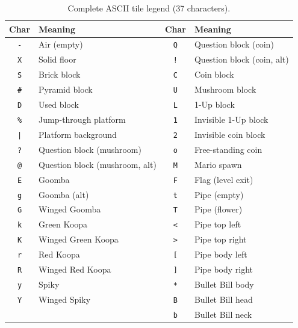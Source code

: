 \documentclass[shortabstract, mgr, english]{iithesis}
\begin{document}
\begin{table}[H]
\centering
\small
\begin{tabular}{cl|cl}
\toprule
\textbf{Char} & \textbf{Meaning} & \textbf{Char} & \textbf{Meaning} \\
\midrule
\texttt{-} & Air (empty)           & \texttt{Q} & Question block (coin) \\
\texttt{X} & Solid floor           & \texttt{!} & Question block (coin, alt) \\
\texttt{S} & Brick block           & \texttt{C} & Coin block \\
\texttt{\#} & Pyramid block        & \texttt{U} & Mushroom block \\
\texttt{D} & Used block            & \texttt{L} & 1-Up block \\
\texttt{\%} & Jump-through platform & \texttt{1} & Invisible 1-Up block \\
\texttt{|}  & Platform background   & \texttt{2} & Invisible coin block \\
\texttt{?} & Question block (mushroom) & \texttt{o} & Free-standing coin \\
\texttt{@} & Question block (mushroom, alt) & \texttt{M} & Mario spawn \\
\texttt{E} & Goomba               & \texttt{F} & Flag (level exit) \\
\texttt{g} & Goomba (alt)          & \texttt{t} & Pipe (empty) \\
\texttt{G} & Winged Goomba         & \texttt{T} & Pipe (flower) \\
\texttt{k} & Green Koopa           & \texttt{<} & Pipe top left \\
\texttt{K} & Winged Green Koopa    & \texttt{>} & Pipe top right \\
\texttt{r} & Red Koopa             & \texttt{[} & Pipe body left \\
\texttt{R} & Winged Red Koopa      & \texttt{]} & Pipe body right \\
\texttt{y} & Spiky                 & \texttt{*} & Bullet Bill body \\
\texttt{Y} & Winged Spiky          & \texttt{B} & Bullet Bill head \\
                &                  & \texttt{b} & Bullet Bill neck \\
\bottomrule
\end{tabular}
\caption{Complete ASCII tile legend (37 characters).}
\label{tab:tile-legend}
\end{table}
\end{document}
